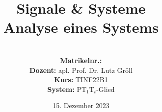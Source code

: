 \documentclass{article}
\title{\textbf{Signale \& Systeme \\ Analyse eines Systems}}
\author{
\vspace{8em} \\
\textbf{Matrikelnr.:} \\
\textbf{Dozent:} apl. Prof. Dr. Lutz Gröll \\
\textbf{Kurs:} TINF22B1 \\
\textbf{System:} PT$_1$T$_t$-Glied
\vspace{8em} 
}
\begin{document}
\date{15. Dezember 2023}

\maketitle


\end{document}
